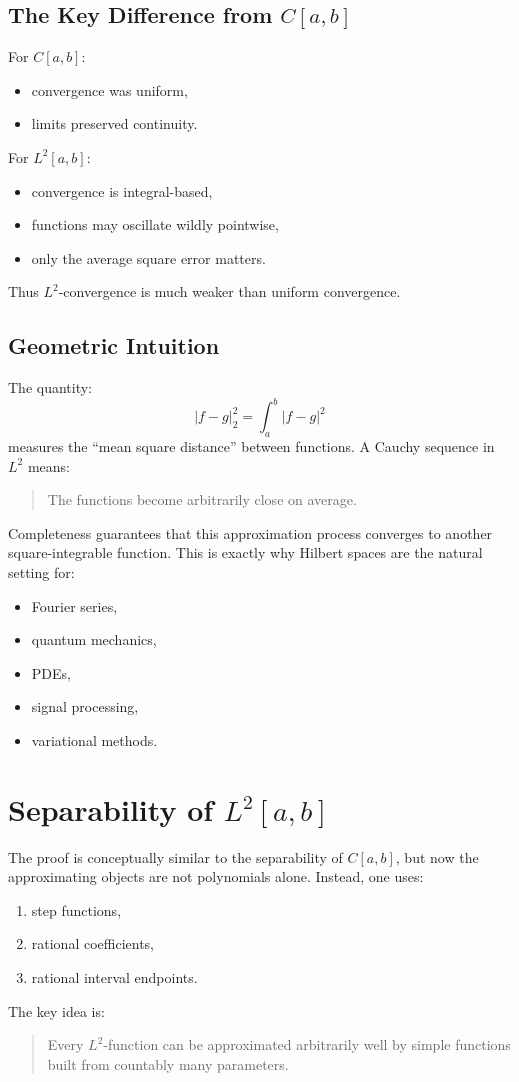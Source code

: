 \documentclass[aps,prl,twocolumn,groupedaddress]{revtex4-2}
\begin{document}
\subsection{The Key Difference from $C[a,b]$}

For $C[a,b]$:
\begin{itemize}
\item convergence was uniform,
\item limits preserved continuity.
\end{itemize}
For $L^2[a,b]$:
\begin{itemize}
\item convergence is integral-based,
\item functions may oscillate wildly pointwise,
\item only the average square error matters.
\end{itemize}
Thus $L^2$-convergence is much weaker than uniform convergence.

\subsection{Geometric Intuition}

The quantity:
$$
|f-g|_2^2
=
\int_a^b |f-g|^2
$$
measures the ``mean square distance'' between functions.
A Cauchy sequence in $L^2$ means:
\begin{quotation}
The functions become arbitrarily close on average.
\end{quotation}
Completeness guarantees that this approximation process converges to another square-integrable function.
This is exactly why Hilbert spaces are the natural setting for:
\begin{itemize}
\item Fourier series,
\item quantum mechanics,
\item PDEs,
\item signal processing,
\item variational methods.
\end{itemize}

\section{
Separability of $L^2[a,b]$
\label{app:D}
}

The proof is conceptually similar to the separability of $C[a,b]$, but now the approximating objects are not polynomials alone. Instead, one uses:
\begin{enumerate}
\item step functions,
\item rational coefficients,
\item rational interval endpoints.
\end{enumerate}
The key idea is:
\begin{quotation}
Every $L^2$-function can be approximated arbitrarily well by simple functions built from countably many parameters.
\end{quotation}
\end{document}
